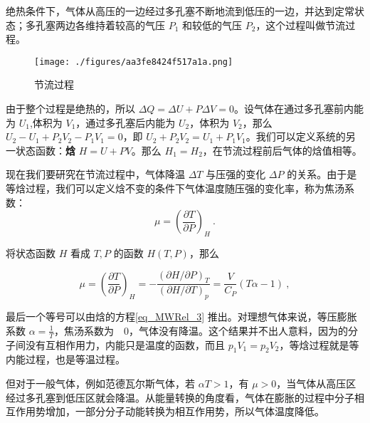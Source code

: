 

绝热条件下，气体从高压的一边经过多孔塞不断地流到低压的一边，并达到定常状态；多孔塞两边各维持着较高的气压 $P_1$ 和较低的气压 $P_2$，这个过程叫做节流过程。

\begin{figure}[ht]
\centering
\texttt{[image: ./figures/aa3fe8424f517a1a.png]}
\caption{节流过程} \label{fig_ttpro_1}
\end{figure}

由于整个过程是绝热的，所以 $\Delta Q=\Delta U+P\Delta V=0$。设气体在通过多孔塞前内能为 $U_1$,体积为 $V_1$，通过多孔塞后内能为 $U_2$，体积为 $V_2$，那么 $U_2-U_1+P_2V_2-P_1V_1=0$，即 $U_2+P_2V_2=U_1+P_1V_1$。我们可以定义系统的另一状态函数：\textbf{焓} $H=U+PV$。那么 $H_1=H_2$，在节流过程前后气体的焓值相等。

现在我们要研究在节流过程中，气体降温 $\Delta T$ 与压强的变化 $\Delta P$ 的关系。由于是等焓过程，我们可以定义焓不变的条件下气体温度随压强的变化率，称为焦汤系数：
\begin{equation}
\mu=\left(\frac{\partial T}{\partial P}\right)_H~.
\end{equation}

将状态函数 $H$ 看成 $T,P$ 的函数 $H(T,P)$，那么

\begin{equation}
\mu=\left(\frac{\partial T}{\partial P}\right)_H=
-\frac{(\partial H/\partial P)_T}{(\partial H/\partial T)_p}
=\frac{V}{C_P}(T\alpha-1)~,
\end{equation}

最后一个等号可以由焓的方程\autoref{eq_MWRel_3}  推出。对理想气体来说，等压膨胀系数 $\alpha=\frac{1}{T}$，焦汤系数为　$0$，气体没有降温。这个结果并不出人意料，因为的分子间没有互相作用力，内能只是温度的函数，而且 $p_1V_1=p_2V_2$，等焓过程就是等内能过程，也是等温过程。

但对于一般气体，例如范德瓦尔斯气体，若 $\alpha T>1$，有 $\mu>0$，当气体从高压区经过多孔塞到低压区就会降温。从能量转换的角度看，气体在膨胀的过程中分子相互作用势增加，一部分分子动能转换为相互作用势，所以气体温度降低。
